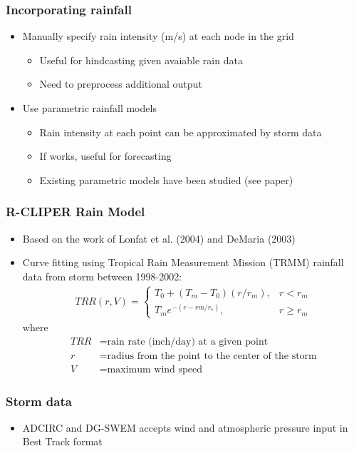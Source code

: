 \documentclass[10pt]{oden_beamer}
\begin{document}
\begin{frame}
  \frametitle{Incorporating rainfall}
  \begin{itemize}
  \item Manually specify rain intensity (m/s) at each node in the grid
    \begin{itemize}
    \item Useful for hindcasting given avaiable rain data
    \item Need to preprocess additional output
    \end{itemize}
  \item Use parametric rainfall models
    \begin{itemize}
    \item Rain intensity at each point can be approximated by storm data
    \item If works, useful for forecasting
    \item Existing parametric models have been studied (see paper)
    \end{itemize}
  \end{itemize}
\end{frame}
\begin{frame}
  \frametitle{R-CLIPER Rain Model}
  \begin{itemize}
  \item Based on the work of Lonfat et al. (2004) and DeMaria (2003)
  \item Curve fitting using Tropical Rain Measurement Mission (TRMM)  rainfall data from storm between 1998-2002:
    \begin{align}
      TRR(r, V) =
    \begin{cases}
      T_0 + (T_m - T_0)(r/r_m), & r < r_m \\
      T_m e^{-(r-rm/r_e)}, & r \geq r_m
    \end{cases}
    \end{align}
    where
    \begin{align*}
      TRR &= \text{rain rate (inch/day) at a given point} \\
      r &= \text{radius from the point to the center of the storm} \\
      V &= \text{maximum wind speed}
    \end{align*}
  \end{itemize}
\end{frame}

\begin{frame}
  \frametitle{Storm data}
  \begin{itemize}
  \item ADCIRC and DG-SWEM accepts wind and atmospheric pressure input in Best Track format
  \end{itemize}
\end{frame}
\end{document}
